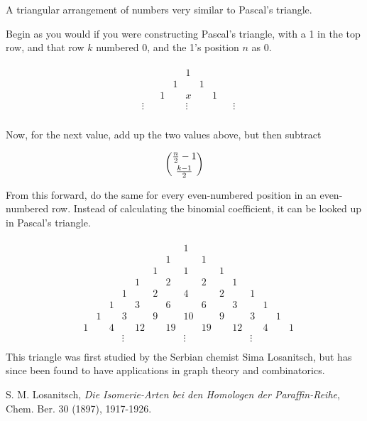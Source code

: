 \documentclass[12pt]{article}
\begin{document}
A triangular arrangement of numbers very similar to Pascal's triangle.

Begin as you would if you were constructing Pascal's triangle, with a 1 in the top row, and that row $k$ numbered 0, and the 1's position $n$ as 0.

\begin{eqnarray*}
\begin{array}{cccccccccccccccccc}
& & & & & & & & & 1 & & & & & & & &\\
& & & & & & & & 1 & & 1 & & & & & & &\\
& & & & & & & 1 & & x & & 1 & & & & & &\\
& & & & &\vdots & & & & \vdots & & & & \vdots& & & & \\
\end{array}
\end{eqnarray*}

Now, for the next value, add up the two values above, but then subtract 

$${{\frac{n}{2}-1} \choose {{k - 1} \over 2}}$$

From this  forward, do the same for every even-numbered position in an even-numbered row. Instead of calculating the binomial coefficient, it can be looked up in Pascal's triangle.

\begin{eqnarray*}
\begin{array}{cccccccccccccccccc}
& & & & & & & & & 1 & & & & & & & &\\
& & & & & & & & 1 & & 1 & & & & & & &\\
& & & & & & & 1 & & 1 & & 1 & & & & & &\\
& & & & & & 1 & & 2 & & 2 & & 1 & & & & &\\
& & & & & 1 & & 2 & & 4 & & 2 & & 1 & & & &\\
& & & & 1 & & 3 & &6 & &6 & & 3 & & 1 & & &\\
& & & 1 & & 3 & &9 & & 10& &9 & & 3 & & 1 & &\\
& & 1 & & 4 & &12 & &19 & &19 & &12 & & 4 & & 1 &\\
& & & & &\vdots & & & & \vdots & & & & \vdots& & & & \\
\end{array}
\end{eqnarray*}
This triangle was first studied by the Serbian chemist Sima Losanitsch, but has since been found to have applications in graph theory and combinatorics.

\begin{thebibliography}{6}
 S. M. Losanitsch, {\it Die Isomerie-Arten bei den Homologen der Paraffin-Reihe}, Chem. Ber. 30 (1897), 1917-1926.
\end{thebibliography}
\end{document}
